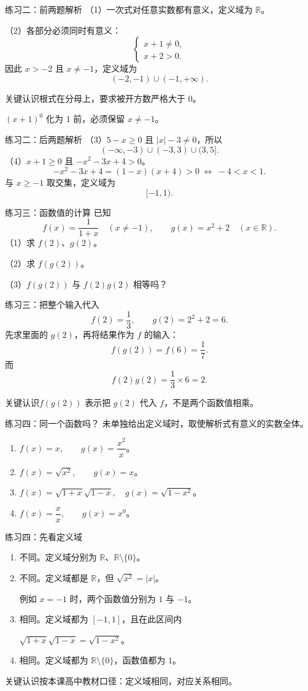 \documentclass[aspectratio=169,10pt]{beamer}
\newcommand{\R}{\mathbb R}
\newcommand{\src}[1]{}
\newcommand{\key}[1]{\begin{block}{关键认识}#1\end{block}}
\begin{document}
\begin{frame}[t]{练习二：前两题解析}
（1）一次式对任意实数都有意义，定义域为 $\R$。\par\bigskip
（2）各部分必须同时有意义：
\[\begin{cases}x+1\ne0,\\x+2>0.\end{cases}\]
因此 $x>-2$ 且 $x\ne-1$，定义域为
\[\boxed{(-2,-1)\cup(-1,+\infty).}\]
\key{根式在分母上，要求被开方数严格大于 $0$。\par
$(x+1)^0$ 化为 $1$ 前，必须保留 $x\ne-1$。}
\end{frame}
\begin{frame}[t]{练习二：后两题解析}
（3）$5-x\ge0$ 且 $|x|-3\ne0$，所以
\[\boxed{(-\infty,-3)\cup(-3,3)\cup(3,5].}\]
（4）$x+1\ge0$ 且 $-x^2-3x+4>0$。
\[-x^2-3x+4=(1-x)(x+4)>0\ \Longleftrightarrow\ -4<x<1.\]
与 $x\ge-1$ 取交集，定义域为
\[\boxed{[-1,1).}\]
\src{端点检查：第（3）题可取5，第（4）题可取-1，但不能取1。}
\end{frame}
\begin{frame}[t]{练习三：函数值的计算}
已知
\[f(x)=\frac1{1+x}\quad(x\ne-1),\qquad g(x)=x^2+2\quad(x\in\R).\]
（1）求 $f(2)$、$g(2)$。\par
（2）求 $f(g(2))$。\par
（3）$f(g(2))$ 与 $f(2)g(2)$ 相等吗？
\src{《三维设计》第32页典例3，第（3）问为自编追问。}
\end{frame}
\begin{frame}[t]{练习三：把整个输入代入}
\[f(2)=\frac13,\qquad g(2)=2^2+2=6.\]
先求里面的 $g(2)$，再将结果作为 $f$ 的输入：
\[f(g(2))=f(6)=\boxed{\frac17}.\]
而
\[f(2)g(2)=\frac13\times6=2.\]
\key{$f(g(2))$ 表示把 $g(2)$ 代入 $f$，不是两个函数值相乘。}
\end{frame}
\begin{frame}[t]{练习四：同一个函数吗？}
未单独给出定义域时，取使解析式有意义的实数全体。
\begin{enumerate}
\item $f(x)=x,\qquad g(x)=\dfrac{x^2}{x}$。
\item $f(x)=\sqrt{x^2},\qquad g(x)=x$。
\item $f(x)=\sqrt{1+x}\sqrt{1-x},\quad g(x)=\sqrt{1-x^2}$。
\item $f(x)=\dfrac{x}{x},\qquad g(x)=x^0$。
\end{enumerate}
\src{（1）教材第60页改编；（2）—（4）据《三维设计》第32页选编。}
\end{frame}
\begin{frame}[t]{练习四：先看定义域}
\begin{enumerate}
\item 不同。定义域分别为 $\R$、$\R\setminus\{0\}$。
\item 不同。定义域都是 $\R$，但 $\sqrt{x^2}=|x|$。\par
例如 $x=-1$ 时，两个函数值分别为 $1$ 与 $-1$。
\item 相同。定义域都为 $[-1,1]$，且在此区间内\par
$\sqrt{1+x}\sqrt{1-x}=\sqrt{1-x^2}$。
\item 相同。定义域都为 $\R\setminus\{0\}$，函数值都为 $1$。
\end{enumerate}
\key{按本课高中教材口径：定义域相同，对应关系相同。}
\end{frame}
\end{document}
